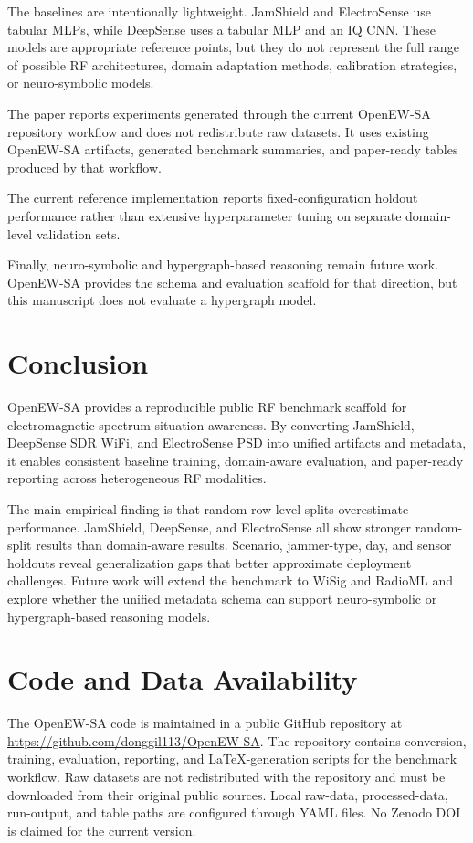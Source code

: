 \documentclass[11pt]{article}
\begin{document}
The baselines are intentionally lightweight. JamShield and ElectroSense use tabular MLPs, while DeepSense uses a tabular MLP and an IQ CNN. These models are appropriate reference points, but they do not represent the full range of possible RF architectures, domain adaptation methods, calibration strategies, or neuro-symbolic models.

The paper reports experiments generated through the current OpenEW-SA repository workflow and does not redistribute raw datasets. It uses existing OpenEW-SA artifacts, generated benchmark summaries, and paper-ready tables produced by that workflow.

The current reference implementation reports fixed-configuration holdout performance rather than extensive hyperparameter tuning on separate domain-level validation sets.

Finally, neuro-symbolic and hypergraph-based reasoning remain future work. OpenEW-SA provides the schema and evaluation scaffold for that direction, but this manuscript does not evaluate a hypergraph model.

\section{Conclusion}

OpenEW-SA provides a reproducible public RF benchmark scaffold for electromagnetic spectrum situation awareness. By converting JamShield, DeepSense SDR WiFi, and ElectroSense PSD into unified artifacts and metadata, it enables consistent baseline training, domain-aware evaluation, and paper-ready reporting across heterogeneous RF modalities.

The main empirical finding is that random row-level splits overestimate performance. JamShield, DeepSense, and ElectroSense all show stronger random-split results than domain-aware results. Scenario, jammer-type, day, and sensor holdouts reveal generalization gaps that better approximate deployment challenges. Future work will extend the benchmark to WiSig and RadioML and explore whether the unified metadata schema can support neuro-symbolic or hypergraph-based reasoning models.

\section{Code and Data Availability}

The OpenEW-SA code is maintained in a public GitHub repository at \url{https://github.com/donggil113/OpenEW-SA}. The repository contains conversion, training, evaluation, reporting, and LaTeX-generation scripts for the benchmark workflow. Raw datasets are not redistributed with the repository and must be downloaded from their original public sources. Local raw-data, processed-data, run-output, and table paths are configured through YAML files. No Zenodo DOI is claimed for the current version.



\end{document}
